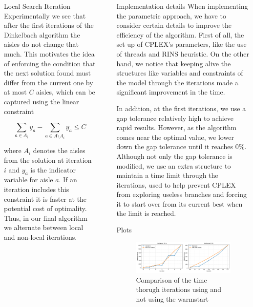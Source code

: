 \documentclass[final]{beamer}
\newlength{\sepwidth}
\newlength{\colwidth}
\newcommand{\separatorcolumn}{\begin{column}{\sepwidth}\end{column}}
\begin{document}
\begin{frame}[t]
\begin{columns}[t]
\begin{column}{\colwidth}
\begin{block}{Local Search Iteration}
    Experimentally we see that after the first iterations of the Dinkelbach algorithm the aisles do not change that much. This motivates the idea of
    enforcing the condition that the next solution found must differ from the current one by at most $C$ aisles, which can be captured using the linear constraint
    
    \[
    \sum_{a \in A_i} y_a - \sum_{a \in A \setminus A_i} y_a \leq C
    \]

    where $A_i$ denotes the aisles from the solution at iteration $i$ and $y_a$ is the indicator variable for aisle $a$. If an iteration includes this constraint it is faster at the potential cost of optimality. Thus, in our final algorithm we alternate between local and non-local iterations.
  
  \end{block}

\end{column}

\separatorcolumn

\begin{column}{\colwidth}

  \begin{block}{Implementation details}
    When implementing the parametric approach, we have to consider certain details to improve the efficiency of the algorithm. 
    First of all, the set up of CPLEX's parameters, like the use of threads and RINS heuristic. 
    On the other hand, we notice that keeping alive the structures like variables and constraints of the model through the iterations made a significant improvement in the time. 

    In addition, at the first iterations, we use a gap tolerance relatively high to achieve rapid results. 
    However, as the algorithm comes near the optimal value, we lower down the gap tolerance until it reaches 0\%. 
    Although not only the gap tolerance is modified, we use an extra structure to maintain a time limit through the iterations, used to help prevent CPLEX from exploring useless branches and forcing it to start over from its current best when the limit is reached. 

  \end{block}

  \begin{block}{Plots}

    \begin{figure}
      \includegraphics{greedy_cmp_time.pdf}
      \caption{Comparison of the time thorugh iterations using and not using the warmstart}
      \label{fig:greedy_cmp_time}
    \end{figure}


\end{block}
\end{column}
\end{columns}
\end{frame}
\end{document}
